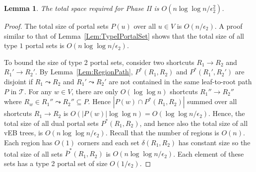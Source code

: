 \documentclass[11pt]{article}
\newtheorem{lemma}{Lemma}
\begin{document}
\begin{lemma}\label{Lem:TypeIIAndIIIPortalSet}
The total space required for Phase II is $O(n\log\log n/\epsilon_2^2)$.
\end{lemma}
\begin{proof}
The total size of portal sets $P(u)$ over all $u\in V$ is $O(n/\epsilon_2)$. A proof similar to that of Lemma~\ref{Lem:TypeIPortalSet} shows that the total size of all type $1$ portal sets is $O(n\log\log n/\epsilon_2)$.

To bound the size of type 2 portal sets, consider two shortcuts $R_1\rightarrow R_2$ and $R_1'\rightarrow R_2'$. By Lemma~\ref{Lem:RegionPath}, $P^*(R_1,R_2)$ and $P^*(R_1',R_2')$ are disjoint if $R_1\leadsto R_2$ and $R_1'\leadsto R_2'$ are not contained in the same leaf-to-root path $P$ in $\mathcal T$. For any $w\in V$, there are only $O(\log\log n)$ shortcuts $R_1''\rightarrow R_2''$ where $R_w\in R_1''\leadsto R_2''\subseteq P$. Hence $|P(w)\cap P^*(R_1,R_2)|$ summed over all shortcuts $R_1\rightarrow R_2$ is $O(|P(w)|\log\log n) = O(\log\log n/\epsilon_2)$. Hence, the total size of all dual portal sets $P^*(R_1,R_2)$, and hence also the total size of all vEB trees, is $O(n\log\log n/\epsilon_2)$. Recall that the number of regions is $O(n)$. Each region has $O(1)$ corners and each set $\delta(R_1,R_2)$ has constant size so the total size of all sets $\overline P^*(R_1,R_2)$ is $O(n\log\log n/\epsilon_2)$. Each element of these sets has a type 2 portal set of size $O(1/\epsilon_2)$.
\end{proof}
\end{document}
